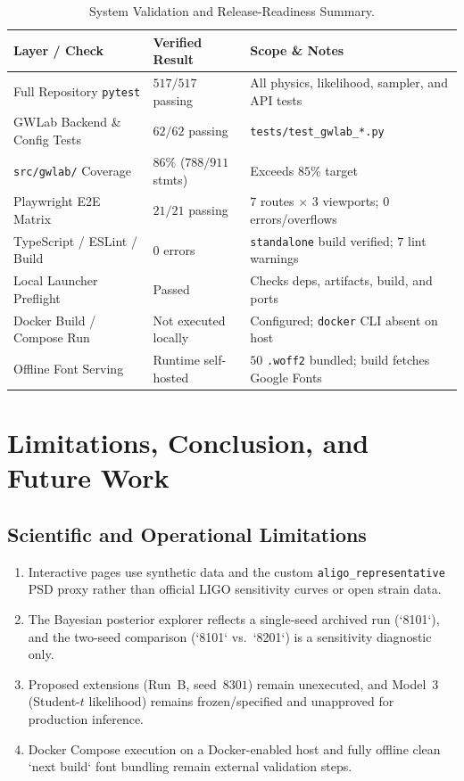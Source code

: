 \documentclass[11pt,a4paper]{report}
\begin{document}
\begin{table}[H]
    \centering
    \caption{System Validation and Release-Readiness Summary.}
    \label{tab:validation_summary}
    \small
    \begin{tabular}{p{4.3cm}p{3.4cm}p{7.2cm}}
        \toprule
        \textbf{Layer / Check} & \textbf{Verified Result} & \textbf{Scope \& Notes} \\
        \midrule
        Full Repository \texttt{pytest} & $517/517$ passing & All physics, likelihood, sampler, and API tests \\
        GWLab Backend \& Config Tests & $62/62$ passing & \texttt{tests/test\_gwlab\_*.py} \\
        \texttt{src/gwlab/} Coverage & $86\%$ ($788/911$ stmts) & Exceeds $85\%$ target \\
        Playwright E2E Matrix & $21/21$ passing & $7$ routes $\times$ $3$ viewports; $0$ errors/overflows \\
        TypeScript / ESLint / Build & $0$ errors & \texttt{standalone} build verified; $7$ lint warnings \\
        Local Launcher Preflight & Passed & Checks deps, artifacts, build, and ports \\
        Docker Build / Compose Run & Not executed locally & Configured; \texttt{docker} CLI absent on host \\
        Offline Font Serving & Runtime self-hosted & $50$ \texttt{.woff2} bundled; build fetches Google Fonts \\
        \bottomrule
    \end{tabular}
\end{table}

\chapter{Limitations, Conclusion, and Future Work}

\section{Scientific and Operational Limitations}
\begin{enumerate}[leftmargin=1.5em]
    \item Interactive pages use synthetic data and the custom \texttt{aligo\_representative} PSD proxy rather than official LIGO sensitivity curves or open strain data.
    \item The Bayesian posterior explorer reflects a single-seed archived run (`8101`), and the two-seed comparison (`8101` vs.\ `8201`) is a sensitivity diagnostic only.
    \item Proposed extensions (Run~B, seed~$8301$) remain unexecuted, and Model~3 (Student-$t$ likelihood) remains frozen/specified and unapproved for production inference.
    \item Docker Compose execution on a Docker-enabled host and fully offline clean `next build` font bundling remain external validation steps.
\end{enumerate}
\end{document}
